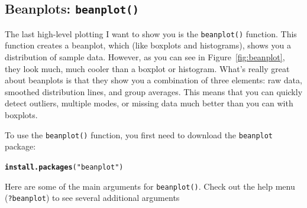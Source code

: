 \documentclass{tufte-book}\usepackage[]{graphicx}\usepackage[]{color}
\makeatletter
\newcommand{\hlstr}[1]{\textcolor[rgb]{0.192,0.494,0.8}{#1}}%
\newcommand{\hlstd}[1]{\textcolor[rgb]{0.345,0.345,0.345}{#1}}%
\newcommand{\hlkwd}[1]{\textcolor[rgb]{0.737,0.353,0.396}{\textbf{#1}}}%
\newenvironment{kframe}{%
 \def\at@end@of@kframe{}%
 \ifinner\ifhmode%
  \def\at@end@of@kframe{\end{minipage}}%
  \begin{minipage}{\columnwidth}%
 \fi\fi%
 \def\FrameCommand##1{\hskip\@totalleftmargin \hskip-\fboxsep
 \colorbox{shadecolor}{##1}\hskip-\fboxsep
     \hskip-\linewidth \hskip-\@totalleftmargin \hskip\columnwidth}%
 \MakeFramed {\advance\hsize-\width
   \@totalleftmargin\z@ \linewidth\hsize
   \@setminipage}}%
 {\par\unskip\endMakeFramed%
 \at@end@of@kframe}
\newenvironment{knitrout}{}{} %
\newcommand{\newfun}[1]{\begin{LARGE} \begin{center} \texttt{#1} \end{center} \end{LARGE}}
\makeatother
\begin{document}
\begin{footnotesize}
\subsection{Beanplots: \texttt{beanplot()}}


The last high-level plotting I want to show you is the \texttt{beanplot()} function. This function creates a beanplot, which (like boxplots and histograms), shows you a distribution of sample data. However, as you can see in Figure~\ref{fig:beanplot}, they look much, much cooler than a boxplot or histogram. What's really great about beanplots is that they show you a combination of three elements: raw data, smoothed distribution lines, and group averages. This means that you can quickly detect outliers, multiple modes, or missing data much better than you can with boxplots.

To use the \texttt{beanplot()} function, you first need to download the \texttt{beanplot} package:

\begin{footnotesize}
\begin{knitrout}
\color{fgcolor}\begin{kframe}
\begin{alltt}
\hlkwd{install.packages}\hlstd{(}\hlstr{"beanplot"}\hlstd{)}
\end{alltt}
\end{kframe}
\end{knitrout}
\end{footnotesize}

Here are some of the main arguments for \texttt{beanplot()}. Check out the help menu (\texttt{?beanplot}) to see several additional arguments


\vspace{5mm} %
\noindent
\setlength{\fboxrule}{1.5pt}
\fbox{
\parbox{\textwidth}{

\newfun{beanplot()}\index{beanplot()}

\hline

\begin{description}


\end{description}}}
\end{footnotesize}
\end{document}
